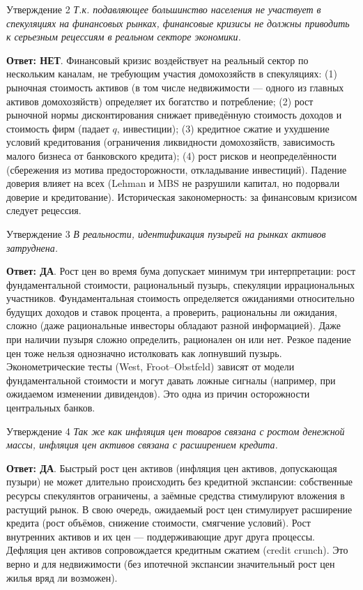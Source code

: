 \documentclass[10pt,a4paper]{article}
\newcommand{\qda}{\textbf{\color{yesgreen}Ответ: ДА}}
\newcommand{\qnet}{\textbf{\color{nored}Ответ: НЕТ}}
\newenvironment{answer}[2]{%
  \begin{qbox}{Утверждение #1}
  \textit{#2}\par\smallskip
}{%
  \end{qbox}\vspace{2pt}
}
\begin{document}
\begin{answer}{2}{Т.к. подавляющее большинство населения не участвует в спекуляциях на финансовых рынках, финансовые кризисы не должны приводить к серьезным рецессиям в реальном секторе экономики.}
\qnet. Финансовый кризис воздействует на реальный сектор по нескольким каналам, не требующим участия домохозяйств в спекуляциях: (1) рыночная стоимость активов (в том числе недвижимости --- одного из главных активов домохозяйств) определяет их богатство и потребление; (2) рост рыночной нормы дисконтирования снижает приведённую стоимость доходов и стоимость фирм (падает $q$, инвестиции); (3) кредитное сжатие и ухудшение условий кредитования (ограничения ликвидности домохозяйств, зависимость малого бизнеса от банковского кредита); (4) рост рисков и неопределённости (сбережения из мотива предосторожности, откладывание инвестиций). Падение доверия влияет на всех (Lehman и MBS не разрушили капитал, но подорвали доверие и кредитование). Историческая закономерность: за финансовым кризисом следует рецессия.
\end{answer}

\begin{answer}{3}{В реальности, идентификация пузырей на рынках активов затруднена.}
\qda. Рост цен во время бума допускает минимум три интерпретации: рост фундаментальной стоимости, рациональный пузырь, спекуляции иррациональных участников. Фундаментальная стоимость определяется ожиданиями относительно будущих доходов и ставок процента, а проверить, рациональны ли ожидания, сложно (даже рациональные инвесторы обладают разной информацией). Даже при наличии пузыря сложно определить, рационален он или нет. Резкое падение цен тоже нельзя однозначно истолковать как лопнувший пузырь. Эконометрические тесты (West, Froot--Obstfeld) зависят от модели фундаментальной стоимости и могут давать ложные сигналы (например, при ожидаемом изменении дивидендов). Это одна из причин осторожности центральных банков.
\end{answer}

\begin{answer}{4}{Так же как инфляция цен товаров связана с ростом денежной массы, инфляция цен активов связана с расширением кредита.}
\qda. Быстрый рост цен активов (инфляция цен активов, допускающая пузыри) не может длительно происходить без кредитной экспансии: собственные ресурсы спекулянтов ограничены, а заёмные средства стимулируют вложения в растущий рынок. В свою очередь, ожидаемый рост цен стимулирует расширение кредита (рост объёмов, снижение стоимости, смягчение условий). Рост внутренних активов и их цен --- поддерживающие друг друга процессы. Дефляция цен активов сопровождается кредитным сжатием (credit crunch). Это верно и для недвижимости (без ипотечной экспансии значительный рост цен жилья вряд ли возможен).
\end{answer}
\end{document}
